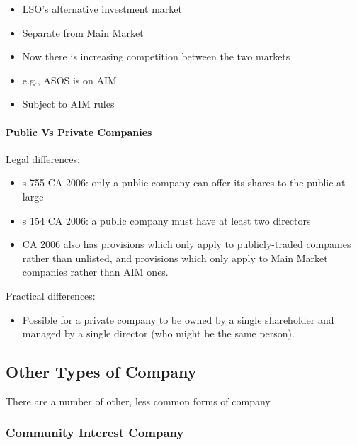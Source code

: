 \documentclass[
]{article}
\providecommand{\tightlist}{%
  \setlength{\itemsep}{0pt}\setlength{\parskip}{0pt}}
\begin{document}
\begin{itemize}
\tightlist
\item
  LSO's alternative investment market
\item
  Separate from Main Market
\item
  Now there is increasing competition between the two markets
\item
  e.g., ASOS is on AIM
\item
  Subject to AIM rules
\end{itemize}

\hypertarget{public-vs-private-companies}{%
\paragraph{Public Vs Private
Companies}\label{public-vs-private-companies}}

Legal differences:

\begin{itemize}
\tightlist
\item
  s 755 CA 2006: only a public company can offer its shares to the
  public at large
\item
  s 154 CA 2006: a public company must have at least two directors
\item
  CA 2006 also has provisions which only apply to publicly-traded
  companies rather than unlisted, and provisions which only apply to
  Main Market companies rather than AIM ones.
\end{itemize}

Practical differences:

\begin{itemize}
\tightlist
\item
  Possible for a private company to be owned by a single shareholder and
  managed by a single director (who might be the same person).
\end{itemize}

\hypertarget{other-types-of-company}{%
\subsection{Other Types of Company}\label{other-types-of-company}}

There are a number of other, less common forms of company.

\hypertarget{community-interest-company}{%
\subsubsection{Community Interest
Company}\label{community-interest-company}}
\end{document}
